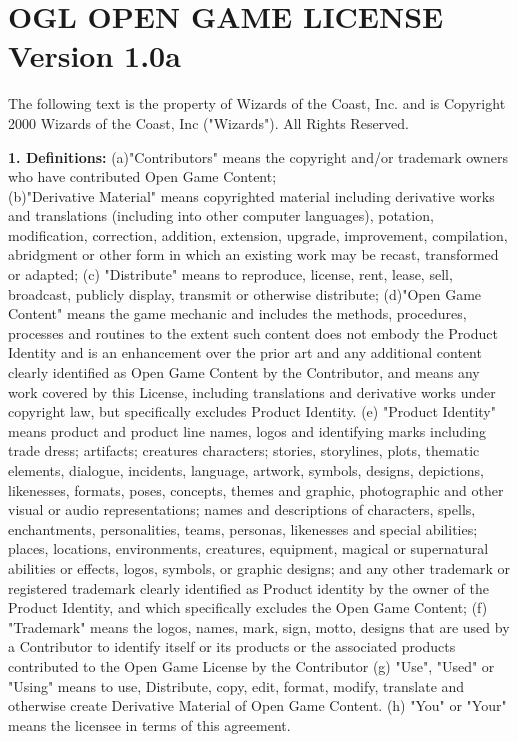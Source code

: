\documentclass[10pt, a4paper, twoside]{book}
\begin{document}
	\section*{OGL OPEN GAME LICENSE Version 1.0a}
	{\footnotesize The following text is the property of Wizards of the Coast, Inc. and is Copyright 2000 Wizards of the Coast, Inc ("Wizards"). All Rights Reserved. \par
	\textbf{1. Definitions:} (a)"Contributors" means the copyright and/or trademark owners who have contributed Open Game Content; \\ (b)"Derivative Material" means copyrighted material including derivative works and translations (including into other computer languages), potation, modification, correction, addition, extension, upgrade, improvement, compilation, abridgment or other form in which an existing work may be recast, transformed or adapted; (c) "Distribute" means to reproduce, license, rent, lease, sell, broadcast, publicly display, transmit or otherwise distribute; (d)"Open Game Content" means the game mechanic and includes the methods, procedures, processes and routines to the extent such content does not embody the Product Identity and is an enhancement over the prior art and any additional content clearly identified as Open Game Content by the Contributor, and means any work covered by this License, including translations and derivative works under copyright law, but specifically excludes Product Identity. (e) "Product Identity" means product and product line names, logos and identifying marks including trade dress; artifacts; creatures characters; stories, storylines, plots, thematic elements, dialogue, incidents, language, artwork, symbols, designs, depictions, likenesses, formats, poses, concepts, themes and graphic, photographic and other visual or audio representations; names and descriptions of characters, spells, enchantments, personalities, teams, personas, likenesses and special abilities; places, locations, environments, creatures, equipment, magical or supernatural abilities or effects, logos, symbols, or graphic designs; and any other trademark or registered trademark clearly identified as Product identity by the owner of the Product Identity, and which specifically excludes the Open Game Content; (f) "Trademark" means the logos, names, mark, sign, motto, designs that are used by a Contributor to identify itself or its products or the associated products contributed to the Open Game License by the Contributor (g) "Use", "Used" or "Using" means to use, Distribute, copy, edit, format, modify, translate and otherwise create Derivative Material of Open Game Content. (h) "You" or "Your" means the licensee in terms of this agreement. \par
}
\end{document}
